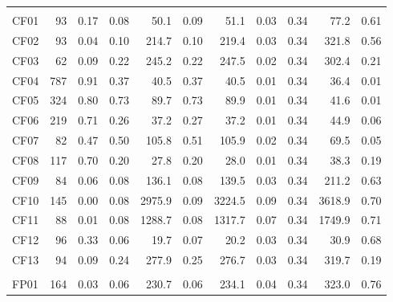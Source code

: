 \begin{longtable}[t]{lrrrrrrrrrr}
\endfoot
\bottomrule
\endlastfoot
\addlinespace[0.3em]
\multicolumn{11}{l}{\textbf{Cut Flowers}}\\
\hspace{1em}CF01 & 93 & 0.17 & 0.08 & 50.1 & 0.09 & 51.1 & 0.03 & 0.34 & 77.2 & 0.61\\
\hspace{1em}CF02 & 93 & 0.04 & 0.10 & 214.7 & 0.10 & 219.4 & 0.03 & 0.34 & 321.8 & 0.56\\
\hspace{1em}CF03 & 62 & 0.09 & 0.22 & 245.2 & 0.22 & 247.5 & 0.02 & 0.34 & 302.4 & 0.21\\
\hspace{1em}CF04 & 787 & 0.91 & 0.37 & 40.5 & 0.37 & 40.5 & 0.01 & 0.34 & 36.4 & 0.01\\
\hspace{1em}CF05 & 324 & 0.80 & 0.73 & 89.7 & 0.73 & 89.9 & 0.01 & 0.34 & 41.6 & 0.01\\
\hspace{1em}CF06 & 219 & 0.71 & 0.26 & 37.2 & 0.27 & 37.2 & 0.01 & 0.34 & 44.9 & 0.06\\
\hspace{1em}CF07 & 82 & 0.47 & 0.50 & 105.8 & 0.51 & 105.9 & 0.02 & 0.34 & 69.5 & 0.05\\
\hspace{1em}CF08 & 117 & 0.70 & 0.20 & 27.8 & 0.20 & 28.0 & 0.01 & 0.34 & 38.3 & 0.19\\
\hspace{1em}CF09 & 84 & 0.06 & 0.08 & 136.1 & 0.08 & 139.5 & 0.03 & 0.34 & 211.2 & 0.63\\
\hspace{1em}CF10 & 145 & 0.00 & 0.08 & 2975.9 & 0.09 & 3224.5 & 0.09 & 0.34 & 3618.9 & 0.70\\
\hspace{1em}CF11 & 88 & 0.01 & 0.08 & 1288.7 & 0.08 & 1317.7 & 0.07 & 0.34 & 1749.9 & 0.71\\
\hspace{1em}CF12 & 96 & 0.33 & 0.06 & 19.7 & 0.07 & 20.2 & 0.03 & 0.34 & 30.9 & 0.68\\
\hspace{1em}CF13 & 94 & 0.09 & 0.24 & 277.9 & 0.25 & 276.7 & 0.03 & 0.34 & 319.7 & 0.19\\
\addlinespace[0.3em]
\multicolumn{11}{l}{\textbf{Fresh Produces}}\\
\hspace{1em}FP01 & 164 & 0.03 & 0.06 & 230.7 & 0.06 & 234.1 & 0.04 & 0.34 & 323.0 & 0.76\\

\end{longtable}
